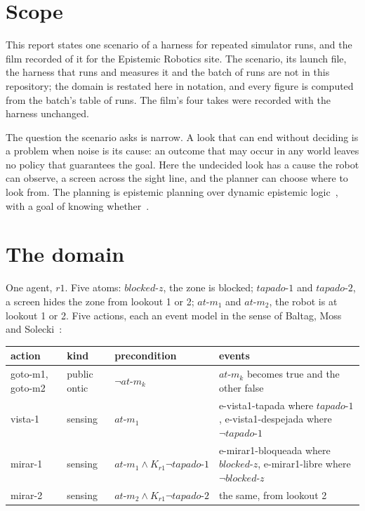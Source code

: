 \documentclass[11pt,a4paper]{article}
\theoremstyle{definition}
\newcommand{\tap}[1]{\mathit{tapado\text{-}#1}}
\newcommand{\bz}{\mathit{blocked\text{-}z}}
\newcommand{\atm}[1]{\mathit{at\text{-}m}_{#1}}
\newcommand{\act}[1]{\textsf{#1}}
\begin{document}
\section{Scope}

This report states one scenario of a harness for repeated simulator runs, and
the film recorded of it for the Epistemic Robotics site. The scenario, its
launch file, the harness that runs and measures it and the batch of runs are
not in this repository; the domain is restated here in notation, and every
figure is computed from the batch's table of runs. The film's four takes were
recorded with the harness unchanged.

The question the scenario asks is narrow. A look that can end without deciding
is a problem when noise is its cause: an outcome that may occur in any world
leaves no policy that guarantees the goal.
Here the undecided look has a cause the robot can observe, a screen across the
sight line, and the planner can choose where to look from. The planning is
epistemic planning over dynamic epistemic logic~\cite{ba2011}, with a goal of
knowing whether~\cite{fhmv1995,pb2002}.

\section{The domain}

One agent, $r1$. Five atoms: $\bz$, the zone is blocked; $\tap{1}$ and
$\tap{2}$, a screen hides the zone from lookout 1 or 2; $\atm{1}$ and
$\atm{2}$, the robot is at lookout 1 or 2. Five actions, each an event model in
the sense of Baltag, Moss and Solecki~\cite{bms1998}:

\begin{center}
\small
\begin{tabularx}{\textwidth}{@{}l l X X@{}}
\toprule
action & kind & precondition & events \\
\midrule
\act{goto-m1}, \act{goto-m2} & public ontic & $\neg\atm{k}$ & $\atm{k}$ becomes true and the other false \\
\act{vista-1} & sensing & $\atm{1}$ & \act{e-vista1-tapada} where $\tap{1}$, \act{e-vista1-despejada} where $\neg\tap{1}$ \\
\act{mirar-1} & sensing & $\atm{1} \wedge K_{r1}\neg\tap{1}$ & \act{e-mirar1-bloqueada} where $\bz$, \act{e-mirar1-libre} where $\neg\bz$ \\
\act{mirar-2} & sensing & $\atm{2} \wedge K_{r1}\neg\tap{2}$ & the same, from lookout 2 \\
\bottomrule
\end{tabularx}
\end{center}
\end{document}
